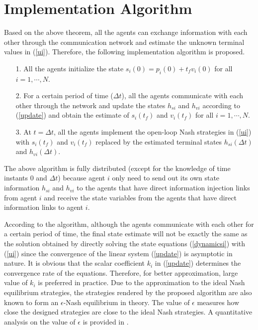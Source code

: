 \documentclass[12pt,draftcls,onecolumn]{IEEEtran}  %
\begin{document}
{\section{Implementation Algorithm}
Based on the above theorem, all the agents can exchange information with each other through the communication network and estimate the unknown terminal values in (\ref{ui}).
Therefore, the following implementation algorithm is proposed.
\begin{Alg}\label{Alg}
\quad
\begin{itemize}
\item[1.] All the agents initialize the state {$s_{i}(0)=p_i(0)+t_fv_i(0)$} for all $i=1,\cdots,N$.
\item[2.] For a certain period of time ($\Delta t$), all the agents communicate with each other through the network and update the states $h_{si}$ and $h_{vi}$ according to (\ref{update}) and obtain the estimate of $s_{i}(t_f)$ and $v_i(t_f)$ for all $i=1,\cdots,N$.
\item[3.] At $t=\Delta t$, all the agents implement the {open-loop Nash} strategies in (\ref{ui}) with $s_i(t_f)$ and $v_i(t_f)$ replaced by the estimated terminal states $h_{si}(\Delta t)$ and $h_{vi}(\Delta t)$.
\end{itemize}
\end{Alg}

The above algorithm is fully distributed (except for the knowledge of time instants 0 and $\Delta t$) because agent $i$ only need to send out its own state information $h_{si}$ and $h_{vi}$ to the agents that have direct information injection links from agent $i$ and receive the state variables from the agents that have direct information links to agent $i$.

\begin{Rmk}
According to the algorithm, although the agents communicate with each other for a certain period of time, the final state estimate will not be exactly the same as the solution obtained by directly solving the state equations (\ref{dynamicsi}) with (\ref{ui}) since the convergence of the linear system (\ref{update}) is asymptotic in nature. It is obvious that the scalar coefficient $k_i$ in (\ref{update}) determines the convergence rate of the equations. Therefore, for better approximation, large value of $k_i$ is preferred in practice. {Due to the approximation to the ideal Nash equilibrium strategies, the strategies rendered by the proposed algorithm are also known to form an $\epsilon$-Nash equilibrium in theory. The value of $\epsilon$ measures how close the designed strategies are close to the ideal Nash strategies. A quantitative analysis on the value of $\epsilon$ is provided in \cite{LinThesis}.}
\end{Rmk}

}
\end{document}
